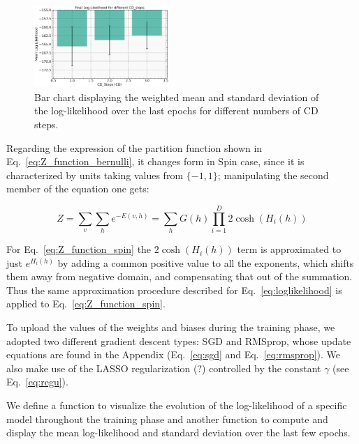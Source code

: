 \documentclass[prl,twocolumn]{revtex4-1}
\begin{document}
\begin{figure}[!tb]
	\includegraphics[width=0.455\textwidth]{final_L_of_CD.png}
	\caption{Bar chart displaying the weighted mean and standard deviation of the log-likelihood over the last epochs for different numbers of CD steps.}
	\label{fig:final_L_of_CD}
\end{figure}

Regarding the expression of the partition function shown in Eq.~\ref{eq:Z_function_bernulli}, it changes form in Spin case, since it is characterized by units taking values from $\{-1,1\}$; manipulating the second member of the equation one gets:

\begin{equation}
	Z=\sum_v\sum_h{e^{-E(v,h)}}=\sum_h{G(h)\prod_{i=1}^D{2\cosh(H_i(h))}}
	\label{eq:Z_function_spin}
\end{equation}

For Eq.~\ref{eq:Z_function_spin} the $2\cosh(H_i(h))$ term is approximated to just $e^{H_i(h)}$ by adding a common positive value to all the exponents, which shifts them away from negative domain, and compensating that out of the summation. Thus the same approximation procedure described for Eq.~\ref{eq:loglikelihood} is applied to Eq.~\ref{eq:Z_function_spin}.

To upload the values of the weights and biases during the training phase, we adopted two different gradient descent types: SGD and RMSprop, whose update equations are found in the Appendix (Eq.~\ref{eq:sgd} and Eq.~\ref{eq:rmsprop}). We also make use of the LASSO regularization (?) controlled by the constant $\gamma$ (see Eq.~\ref{eq:regu}).

We define a function to visualize the evolution of the log-likelihood of a specific model throughout the training phase and another function to compute and display the mean log-likelihood and standard deviation over the last few epochs. 
\end{document}
